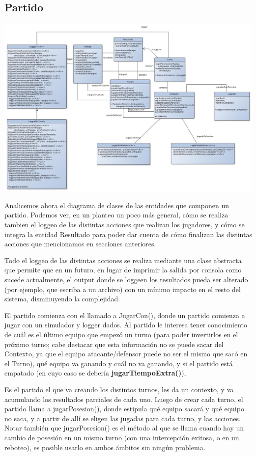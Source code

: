 \subsection{Partido}
\begin{center}
\includegraphics[scale=0.4, angle=90]{diseno/partido.jpg}
\end{center}
Analicemos ahora el diagrama de clases de las entidades que componen un partido. Podemos ver, en un planteo un poco más general, cómo se realiza tambien el loggeo de las distintas acciones que realizan los jugadores, y cómo se integra la entidad Resultado para poder dar cuenta de cómo finalizan las distintas acciones que mencionamos en secciones anteriores. 

Todo el loggeo de las distintas acciones se realiza mediante una clase abstracta que permite que en un futuro, en lugar de imprimir la salida por consola como sucede actualmente, el output donde se loggeen los resultados pueda ser alterado (por ejemplo, que escriba a un archivo) con un mínimo impacto en el resto del sistema, disminuyendo la complejidad.

El partido comienza con el llamado a JugarCon(), donde un partido comienza a jugar con un simulador y logger dados. Al partido le interesa tener conocimiento de cuál es el último equipo que empezó un turno (para poder invertirlos en el próximo turno; cabe destacar que esta información no se puede sacar del Contexto, ya que el equipo atacante/defensor puede no ser el mismo que sacó en el Turno), qué equipo va ganando y cuál no va ganando, y si el partido está empatado (en cuyo caso se debería \textbf{jugarTiempoExtra()}), 

Es el partido el que va creando los distintos turnos, les da un contexto, y va acumulando los resultados parciales de cada uno. Luego de crear cada turno, el partido llama a jugarPosesion(), donde estipula qué equipo sacará y qué equipo no saca, y a partir de allí se eligen las jugadas para cada turno, y las acciones. Notar también que jugarPosesion() es el método al que se llama cuando hay un cambio de posesión en un mismo turno (con una intercepción exitosa, o en un reboteo), es posible usarlo en ambos ámbitos sin ningún problema.


